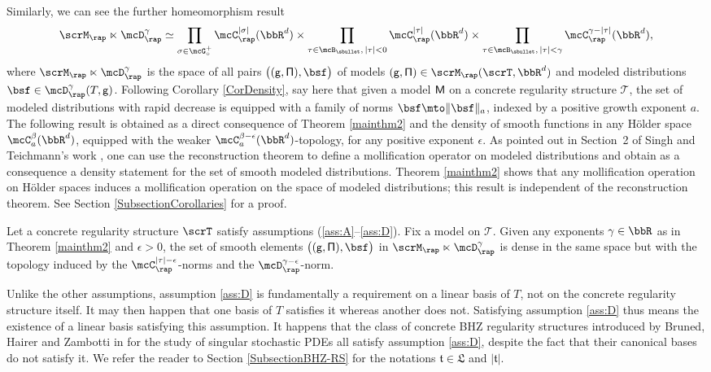 Similarly, we can see the further homeomorphism result
\[
\scrM_{\rap}\ltimes\mcD_{\rap}^\gamma \simeq
\prod_{\sigma\in\mcG_\circ^+} \mcC_\rap^{|\sigma|}(\bbR^d) \times \prod_{\tau\in\mcB_\sbullet,\,|\tau|<0} \mcC_\rap^{|\tau|}(\bbR^d)
\times \prod_{\tau\in\mcB_\sbullet,\, |\tau|<\gamma} \mcC_\rap^{\gamma-|\tau|}(\bbR^d),
\]
where $\scrM_{\rap}\ltimes\mcD_{\rap}^\gamma$ is the space of all pairs $\bigl(({\sf g},{\sf\Pi}),\bsf\bigr)$ of models $({\sf g},{\sf\Pi})\in\scrM_{\rap}(\scrT,\bbR^d)$ and modeled distributions $\bsf\in\mcD_{\rap}^\gamma(T,{\sf g})$. Following Corollary \ref{CorDensity}, say here that given a model $\sf M$ on a concrete regularity structure $\mathscr{T}$, the set of modeled distributions with rapid decrease is equipped with a family of norms $\bsf \mto \|\bsf\|_a$, indexed by a positive growth exponent $a$. The following result is obtained as a direct consequence of Theorem \ref{mainthm2} and the density of smooth functions in any Hölder space $\mcC_a^\beta(\bbR^d)$, equipped with the weaker $\mcC_a^{\beta-\epsilon}(\bbR^d)$-topology, for any positive exponent $\epsilon$. As pointed out in Section~2 of Singh and Teichmann's work \cite{SinghTeichmann}, one can use the reconstruction theorem to define a mollification operator on modeled distributions and obtain as a consequence a density statement for the set of smooth modeled distributions. Theorem \ref{mainthm2} shows that any mollification operation on Hölder spaces induces a mollification operation on the space of modeled distributions; this result is independent of the reconstruction theorem. See Section \ref{SubsectionCorollaries} for a proof.

\begin{cor} \label{CorDensitySmoothModelled}
Let a concrete regularity structure $\scrT$ satisfy assumptions \textup{(\ref{ass:A}--\ref{ass:D})}. Fix a model on $\mathscr{T}$. Given any exponents $\gamma\in\bbR$ as in Theorem \ref{mainthm2} and $\epsilon>0$, the set of smooth elements $\bigl(({\sf g},{\sf\Pi}),\bsf\bigr)$ in $\scrM_{\rap}\ltimes\mcD_{\rap}^\gamma$ is dense in the same space but with the topology induced by the $\mcC_{\rap}^{|\tau|-\epsilon}$-norms and the $\mcD_{\rap}^{\gamma-\epsilon}$-norm.
\end{cor}

Unlike the other assumptions, assumption \eqref{ass:D} is fundamentally a requirement on a linear basis of $T$, not on the concrete regularity structure itself. It may then happen that one basis of $T$ satisfies it whereas another does not. Satisfying assumption \eqref{ass:D} thus means the existence of a linear basis satisfying this assumption. It happens that the class of concrete BHZ regularity structures introduced by Bruned, Hairer and Zambotti in \cite{BHZ} for the study of singular stochastic PDEs all satisfy assumption \eqref{ass:D}, despite the fact that their canonical bases do not satisfy it. We refer the reader to Section \ref{SubsectionBHZ-RS} for the notations $\mathfrak{t}\in\mathfrak{L}$ and $|\mathfrak{t}|$.

